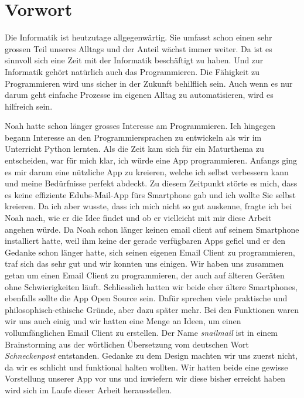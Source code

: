 \documentclass[a4paper,11pt]{article}
\begin{document}
\tableofcontents
\pagebreak

\section{Vorwort}
Die Informatik ist heutzutage allgegenwärtig. Sie umfasst schon einen sehr grossen Teil unseres Alltags und der Anteil wächst immer weiter. Da ist es sinnvoll sich 
eine Zeit mit der Informatik beschäftigt zu haben. Und zur Informatik gehört natürlich auch das Programmieren. Die Fähigkeit zu Programmieren wird uns sicher in der
Zukunft behilflich sein. Auch wenn es nur darum geht einfache Prozesse im eigenen Alltag zu automatisieren, wird es hilfreich sein. 

Noah hatte schon länger grosses Interesse am Programmieren. Ich hingegen begann Interesse an den Programmiersprachen zu entwickeln als wir im Unterricht 
Python lernten. Als die Zeit kam sich für ein Maturthema zu entscheiden, war für mich klar, ich würde eine App programmieren. Anfangs ging es mir darum eine 
nützliche App zu kreieren, welche ich selbst verbessern kann und meine Bedürfnisse perfekt abdeckt.
Zu diesem Zeitpunkt störte es mich, dass es keine effiziente Edubs-Mail-App fürs Smartphone gab und ich wollte Sie selbst kreieren. 
Da ich aber wusste, dass ich mich nicht so gut auskenne, fragte ich bei Noah nach, wie er die Idee findet und ob er vielleicht mit mir diese Arbeit 
angehen würde.
Da Noah schon länger keinen \gls{email client} auf seinem Smartphone installiert hatte, weil ihm keine der gerade verfügbaren Apps gefiel und er den Gedanke 
schon länger hatte, sich seinen eigenen Email Client zu programmieren, traf sich das sehr gut und wir konnten uns einigen. 
Wir haben uns zusammen getan um einen Email Client zu programmieren, der auch auf älteren Geräten ohne Schwierigkeiten läuft. Schliesslich hatten wir beide
eher ältere Smartphones, ebenfalls sollte die App Open Source sein. 
Dafür sprechen viele praktische und philosophisch-ethische Gründe, aber dazu später mehr.
Bei den Funktionen waren wir uns auch einig und wir hatten eine Menge an Ideen, um einen vollumfänglichen Email Client zu erstellen. Der Name \textit{snailmail} ist in einem 
Brainstorming aus der wörtlichen Übersetzung vom deutschen Wort \textit{Schneckenpost} entstanden. Gedanke zu dem Design machten wir uns zuerst nicht,
da wir es schlicht und funktional halten wollten. 
Wir hatten beide eine gewisse Vorstellung unserer App vor uns und inwiefern wir diese bisher erreicht haben wird sich im Laufe dieser Arbeit herausstellen. \\
\end{document}
